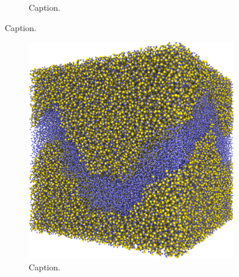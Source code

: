 \begin{figure}[htpb]
\begin{subfigure}[b]{\myfigwidth}
        \caption{Caption.}%
    \end{subfigure}%
    \caption{%
        Caption. %
    }%
\end{figure}%

%
\begin{figure}[htpb]%
    \centering%
    \setlength{\myfigwidth}{0.49\textwidth}%
%
    \begin{subfigure}[b]{\myfigwidth}%
        \centering%
        \includegraphics[width=\textwidth]{images/systems/trimmed-rough_fracture05_05}%
        \caption{Caption.}%
    \end{subfigure}%
    \hfill%
    \begin{subfigure}[b]{\myfigwidth}%
        \centering%

\end{subfigure}
\end{figure}
